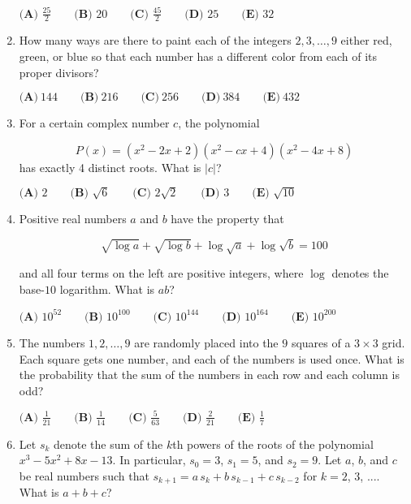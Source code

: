 \documentclass{article}
\begin{document}
\begin{enumerate}[label=\arabic*., itemsep=0.5em]
\(\textbf{(A) } \frac{25}{2} \qquad\textbf{(B) } 20 \qquad\textbf{(C) } \frac{45}{2} \qquad\textbf{(D) } 25 \qquad\textbf{(E) } 32\)\par \vspace{0.5em}\item How many ways are there to paint each of the integers \(2, 3, \dots, 9\) either red, green, or blue so that each number has a different color from each of its proper divisors?

\(\textbf{(A)}\ 144\qquad\textbf{(B)}\ 216\qquad\textbf{(C)}\ 256\qquad\textbf{(D)}\ 384\qquad\textbf{(E)}\ 432\)\par \vspace{0.5em}\item For a certain complex number \(c\), the polynomial

\begin{equation*}
P(x) = (x^2 - 2x + 2)(x^2 - cx + 4)(x^2 - 4x + 8)
\end{equation*}
has exactly 4 distinct roots. What is \(|c|\)?

\(\textbf{(A) } 2 \qquad \textbf{(B) } \sqrt{6} \qquad \textbf{(C) } 2\sqrt{2} \qquad \textbf{(D) } 3 \qquad \textbf{(E) } \sqrt{10}\)\par \vspace{0.5em}\item Positive real numbers \(a\) and \(b\) have the property that

\begin{equation*}
\sqrt{\log{a}} + \sqrt{\log{b}} + \log \sqrt{a} + \log \sqrt{b} = 100
\end{equation*}


and all four terms on the left are positive integers, where \(\log\) denotes the base-\(10\) logarithm. What is \(ab\)?

\(\textbf{(A) }   10^{52}   \qquad        \textbf{(B) }   10^{100}   \qquad    \textbf{(C) }   10^{144}   \qquad   \textbf{(D) }  10^{164} \qquad  \textbf{(E) }   10^{200} \)\par \vspace{0.5em}\item The numbers \(1,2,\dots,9\) are randomly placed into the \(9\) squares of a \(3 \times 3\) grid. Each square gets one number, and each of the numbers is used once. What is the probability that the sum of the numbers in each row and each column is odd?

\(\textbf{(A) }\frac{1}{21}\qquad\textbf{(B) }\frac{1}{14}\qquad\textbf{(C) }\frac{5}{63}\qquad\textbf{(D) }\frac{2}{21}\qquad\textbf{(E) } \frac17\)\par \vspace{0.5em}\item Let \(s_k\) denote the sum of the \(\textit{k}\)th powers of the roots of the polynomial \(x^3-5x^2+8x-13\). In particular, \(s_0=3\), \(s_1=5\), and \(s_2=9\). Let \(a\), \(b\), and \(c\) be real numbers such that \(s_{k+1} = a \, s_k + b \, s_{k-1} + c \, s_{k-2}\) for \(k = 2\), \(3\), \(....\) What is \(a+b+c\)?


\end{enumerate}
\end{document}
